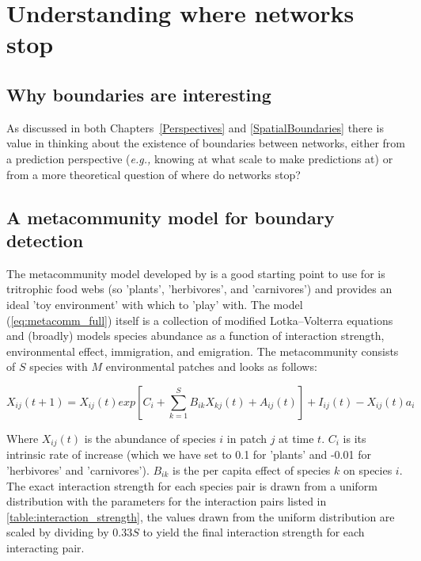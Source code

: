 \anglais
\chapter{Understanding where networks stop}\label{supp:boundaries}

\section{Why boundaries are interesting}

As discussed in both Chapters~\ref{Perspectives} and \ref{SpatialBoundaries}
there is value in thinking about the existence of boundaries between networks,
either from a prediction perspective (\emph{e.g.,} knowing at what scale to 
make predictions at) or from a more theoretical question of where do networks
stop?

\section{A metacommunity model for boundary detection}

The metacommunity model developed by \cite{Thompson2017Dispersal} is a good
starting point to use for \cite{Thompson2017Dispersal} is tritrophic food 
webs (so 'plants', 'herbivores', and 'carnivores') and provides 
an ideal 'toy environment' with which to 'play' with. The model
(\ref{eq:metacomm_full}) itself is a collection of modified Lotka–Volterra
equations and (broadly) models species abundance as a function of interaction
strength, environmental effect, immigration, and emigration. The metacommunity consists of $S$ species with $M$ environmental patches and looks as follows:

\begin{equation} \label{eq:metacomm_full}
X_{ij}(t+1)=X_{ij}(t)exp\left[C_{i} + \sum_{k=1}^{S}B_{ik}X_{kj}(t)+A_{ij}(t)\right]+I_{ij}(t)-X_{ij}(t)a_{i}
\end{equation}

Where $X_{ij}(t)$ is the abundance of species $i$ in patch $j$ at time $t$. $C_i$
is its intrinsic rate of increase (which we have set to 0.1 for 'plants' and
-0.01 for 'herbivores' and 'carnivores'). $B_{ik}$ is the per capita effect of
species $k$ on species $i$. The exact interaction strength for each species pair
is drawn from a uniform distribution with the parameters for the 
interaction pairs listed in \autoref{table:interaction_strength}, the values
drawn from the uniform distribution are scaled by dividing by $0.33S$ to yield
the final interaction strength for each interacting pair.

